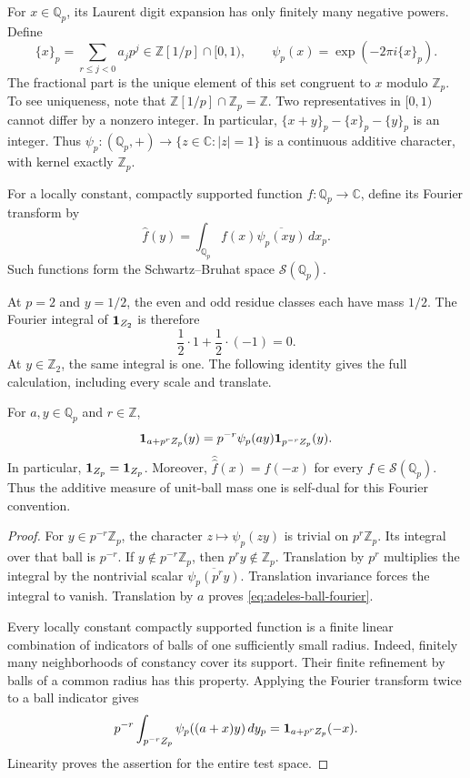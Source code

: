 For \(x\in\mathbb Q_p\), its Laurent digit expansion has only finitely many
negative powers. Define
\[
 \{x\}_p=\sum_{r\leq j<0}a_jp^j
 \in\mathbb Z[1/p]\cap[0,1),\qquad
 \psi_p(x)=\exp(-2\pi i\{x\}_p).
\]
The fractional part is the unique element of this set congruent to \(x\)
modulo \(\mathbb Z_p\). To see uniqueness, note that
\(\mathbb Z[1/p]\cap\mathbb Z_p=\mathbb Z\). Two representatives in \([0,1)\)
cannot differ by a nonzero integer.
In particular, \(\{x+y\}_p-\{x\}_p-\{y\}_p\) is an integer.
Thus \(\psi_p:(\mathbb Q_p,+)\to\{z\in\mathbb C:|z|=1\}\) is a continuous
additive character, with kernel exactly \(\mathbb Z_p\).

For a locally constant, compactly supported function \(f:\mathbb Q_p\to\mathbb C\),
define its Fourier transform by
\[
 \widehat f(y)=\int_{\mathbb Q_p}f(x)\overline{\psi_p(xy)}\,dx_p.
\]
Such functions form the Schwartz--Bruhat space \(\mathcal S(\mathbb Q_p)\).

At \(p=2\) and \(y=1/2\), the even and odd residue classes each have
mass \(1/2\). The Fourier integral of \(\mathbf 1_{Z_2}\) is therefore
\[
 \frac12\cdot1+\frac12\cdot(-1)=0.
\]
At \(y\in\mathbb Z_2\), the same integral is one. The following identity
gives the full calculation, including every scale and translate.

\begin{proposition}
\label{prop:adeles-ball-fourier}
For \(a,y\in\mathbb Q_p\) and \(r\in\mathbb Z\),
\begin{equation}
 \mathbf 1_{a+p^rZ_p}(y)
 =p^{-r}\psi_p(ay)\mathbf 1_{p^{-r}Z_p}(y).
 \label{eq:adeles-ball-fourier}
\end{equation}
In particular, \(\mathbf 1_{Z_p}=\mathbf 1_{Z_p}\).
Moreover, \(\widehat{\widehat f}(x)=f(-x)\) for every
\(f\in\mathcal S(\mathbb Q_p)\). Thus the additive measure of unit-ball mass one
is self-dual for this Fourier convention.
\end{proposition}

\begin{proof}
For \(y\in p^{-r}\mathbb Z_p\),
the character \(z\mapsto\psi_p(zy)\) is trivial on \(p^r\mathbb Z_p\).
Its integral over that ball is \(p^{-r}\).
If \(y\notin p^{-r}\mathbb Z_p\), then \(p^ry\notin\mathbb Z_p\).
Translation by \(p^r\) multiplies the integral by the nontrivial scalar
\(\overline{\psi_p(p^ry)}\). Translation invariance forces the integral
to vanish. Translation by \(a\) proves
\eqref{eq:adeles-ball-fourier}.

Every locally constant compactly supported function is a finite linear
combination of indicators of balls of one sufficiently small radius.
Indeed, finitely many neighborhoods of constancy cover its support.
Their finite refinement by balls of a common radius has this property.
Applying the Fourier transform twice to a ball indicator gives
\[
 p^{-r}\int_{p^{-r}Z_p}
       \psi_p((a+x)y)\,dy_p
 =\mathbf 1_{a+p^rZ_p}(-x).
\]
Linearity proves the assertion for the entire test space.
\end{proof}

